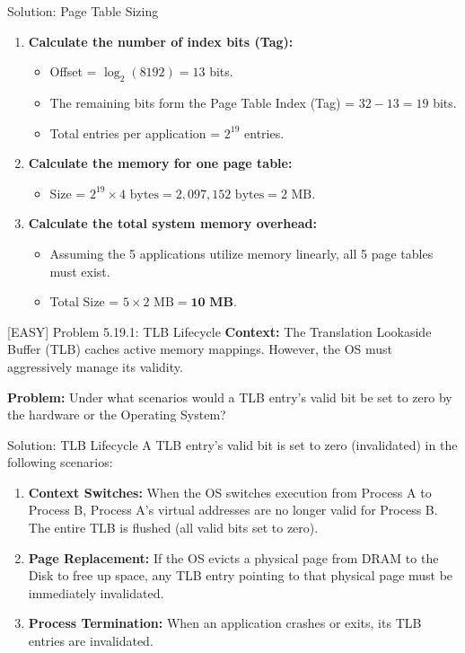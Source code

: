 \documentclass[aspectratio=169]{beamer}
\begin{document}
\begin{frame}{Solution: Page Table Sizing}
\begin{enumerate}
    \item \textbf{Calculate the number of index bits (Tag):}
    \begin{itemize}
        \item Offset = $\log_2(8192) = 13$ bits.
        \item The remaining bits form the Page Table Index (Tag) = $32 - 13 = 19$ bits.
        \item Total entries per application = $2^{19}$ entries.
    \end{itemize}
    \item \textbf{Calculate the memory for one page table:}
    \begin{itemize}
        \item Size = $2^{19} \times 4 \text{ bytes} = 2,097,152 \text{ bytes} = 2 \text{ MB}$.
    \end{itemize}
    \item \textbf{Calculate the total system memory overhead:}
    \begin{itemize}
        \item Assuming the 5 applications utilize memory linearly, all 5 page tables must exist.
        \item Total Size = $5 \times 2 \text{ MB} = \mathbf{10 \text{ MB}}$.
    \end{itemize}
\end{enumerate}
\end{frame}

\begin{frame}{[EASY] Problem 5.19.1: TLB Lifecycle}
\textbf{Context:} The Translation Lookaside Buffer (TLB) caches active memory mappings. However, the OS must aggressively manage its validity.
\vspace{0.5cm}

\textbf{Problem:}
Under what scenarios would a TLB entry's valid bit be set to zero by the hardware or the Operating System?
\end{frame}

\begin{frame}{Solution: TLB Lifecycle}
A TLB entry's valid bit is set to zero (invalidated) in the following scenarios:
\begin{enumerate}
    \item \textbf{Context Switches:} When the OS switches execution from Process A to Process B, Process A's virtual addresses are no longer valid for Process B. The entire TLB is flushed (all valid bits set to zero).
    \item \textbf{Page Replacement:} If the OS evicts a physical page from DRAM to the Disk to free up space, any TLB entry pointing to that physical page must be immediately invalidated.
    \item \textbf{Process Termination:} When an application crashes or exits, its TLB entries are invalidated.
\end{enumerate}
\end{frame}
\end{document}
